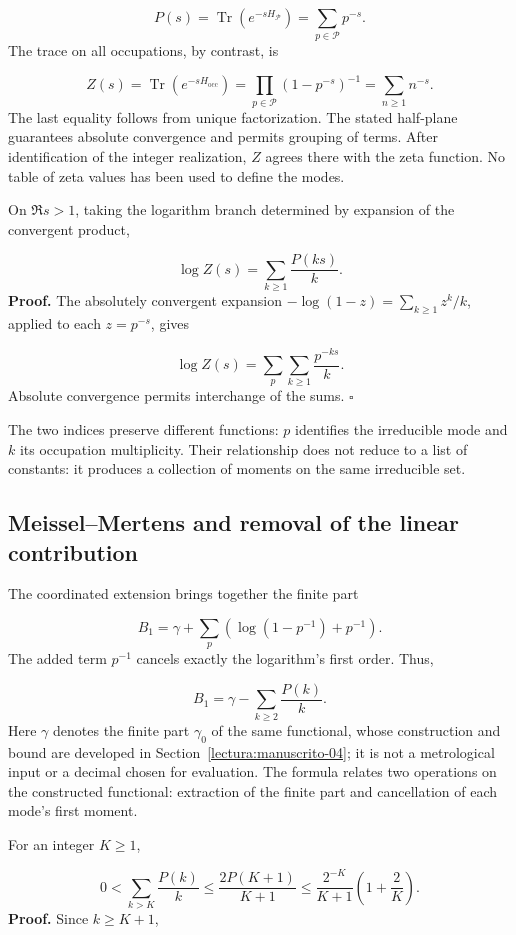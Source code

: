 \[
P(s)=\operatorname{Tr}(e^{-sH_{\mathcal P}})=\sum_{p\in\mathcal P}p^{-s}.
\]
The trace on all occupations, by contrast, is

\[
Z(s)=\operatorname{Tr}(e^{-sH_{\mathrm{occ}}})
=\prod_{p\in\mathcal P}(1-p^{-s})^{-1}
=\sum_{n\ge1}n^{-s}.
\]
The last equality follows from unique factorization. The stated half-plane guarantees absolute convergence and permits grouping of terms. After identification of the integer realization, $Z$ agrees there with the zeta function. No table of zeta values has been used to define the modes.

On $\Re s>1$, taking the logarithm branch determined by expansion of the convergent product,

\[
\log Z(s)=\sum_{k\ge1}\frac{P(ks)}{k}.
\]
\textbf{Proof.} The absolutely convergent expansion $-\log(1-z)=\sum_{k\ge1}z^k/k$, applied to each $z=p^{-s}$, gives

\[
\log Z(s)=\sum_p\sum_{k\ge1}\frac{p^{-ks}}k.
\]
Absolute convergence permits interchange of the sums. \hfill\(\square\)

The two indices preserve different functions: $p$ identifies the irreducible mode and $k$ its occupation multiplicity. Their relationship does not reduce to a list of constants: it produces a collection of moments on the same irreducible set.

\subsection{Meissel–Mertens and removal of the linear contribution}
The coordinated extension brings together the finite part

\[
B_1=\gamma+\sum_p\left(\log(1-p^{-1})+p^{-1}\right).
\]
The added term $p^{-1}$ cancels exactly the logarithm's first order. Thus,

\[
B_1=\gamma-\sum_{k\ge2}\frac{P(k)}k.
\]
Here $\gamma$ denotes the finite part $\gamma_0$ of the same functional, whose construction and bound are developed in Section~\ref{lectura:manuscrito-04}; it is not a metrological input or a decimal chosen for evaluation. The formula relates two operations on the constructed functional: extraction of the finite part and cancellation of each mode's first moment.

For an integer $K\ge1$,

\[
0<\sum_{k>K}\frac{P(k)}k
\le\frac{2P(K+1)}{K+1}
\le\frac{2^{-K}}{K+1}\left(1+\frac2K\right).
\]
\textbf{Proof.} Since $k\ge K+1$,

